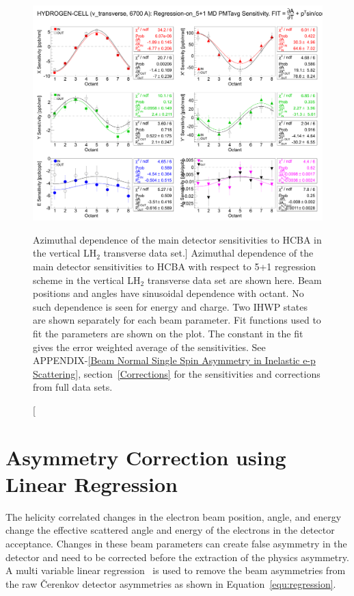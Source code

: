 \begin{figure}[!h]
	\begin{center}
	\includegraphics[width=15.0cm]{figures/MD_v_transverse_5+1_Sensitivities}
	\end{center}
	\caption
	[Azimuthal dependence of the main detector sensitivities to HCBA in the vertical LH$_{2}$ transverse data set.]	
	{Azimuthal dependence of the main detector sensitivities to HCBA with respect to 5+1 regression scheme in the vertical LH$_{2}$ transverse data set are shown here. Beam positions and angles have sinusoidal dependence with octant. No such dependence is seen for energy and charge. Two IHWP states are shown separately for each beam parameter. Fit functions used to fit the parameters are shown on the plot. The constant in the fit gives the error weighted average of the sensitivities. See APPENDIX-\ref{Beam Normal Single Spin Asymmetry in Inelastic e-p Scattering}, section~\ref{Corrections}  for the sensitivities and corrections from full data sets.}
	\label{fig:MD_v_transverse_5+1_Sensitivities}
\end{figure}


\section{Asymmetry Correction using Linear Regression}
\label{Asymmetry Correction using Linear Regression}

The helicity correlated changes in the electron beam position, angle, and energy change the effective scattered angle and energy of the electrons in the detector acceptance.
Changes in these beam parameters can create false asymmetry in the detector and need to be corrected before the extraction of the physics asymmetry. A multi variable linear regression~\cite{linRegTechNote} is used to remove the beam asymmetries from the raw \v{C}erenkov detector asymmetries as shown in Equation~\ref{equ:regression}.

